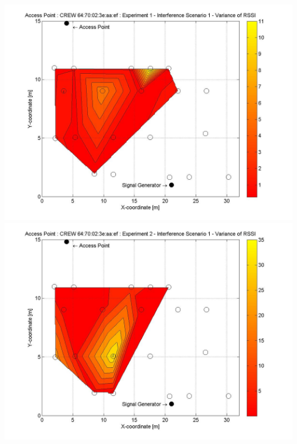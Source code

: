 \documentclass[11pt,a4paper,headinclude,footinclude,chapterprefix=on]{scrreprt}
\begin{document}
\begin{longtable}
	\includegraphics[width=13cm]{../../Source/plot/CREW_ef/ef_Sig_Ex_1_Variance.jpg} \\
	\includegraphics[width=13cm]{../../Source/plot/CREW_ef/ef_Sig_Ex_2_Variance.jpg} \\
\end{longtable}
\end{document}
